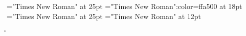 \font\entryletHeaddiv="Times New Roman" at 25pt
\font{}="Times New Roman":color=ffa500 at 18pt
\font{}="Times New Roman" at 25pt
\font\div="Times New Roman" at 12pt
 \r\n
{}


\bye
